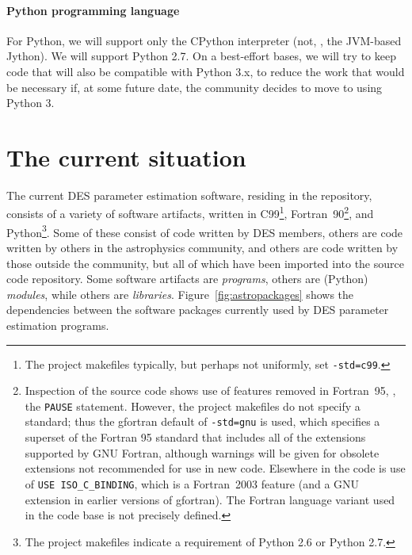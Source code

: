 \documentclass[draftmode,draftwater]{memarticle}
\newcommand{\despipe}{\name{des-pipe}\xspace}
\begin{document}
\subsubsection{Python programming language}

For Python, we will support only the CPython interpreter (not, \eg, the
JVM-based Jython). We will support Python 2.7. On a best-effort bases,
we will try to keep code that will also be compatible with Python 3.x,
to reduce the work that would be necessary if, at some future date, the
community decides to move to using Python 3.



\chapter{The current situation\label{ch:current_situation}}

The current DES parameter estimation software, residing in the
\despipe repository, consists of a variety of software
artifacts, written in C99\footnote{The project makefiles typically, but
  perhaps not uniformly, set \texttt{-std=c99}.},
Fortran~90\footnote{Inspection of the source code shows use of features
  removed in Fortran~95, \eg, the \texttt{PAUSE} statement. However, the
  project makefiles do not specify a standard; thus the gfortran default
  of \texttt{-std=gnu} is used, which specifies a superset of the
  Fortran 95 standard that includes all of the extensions supported by
  GNU Fortran, although warnings will be given for obsolete extensions
  not recommended for use in new code. Elsewhere in the code is use of
  \texttt{USE ISO\_C\_BINDING}, which is a Fortran~2003 feature (and a
  GNU extension in earlier versions of gfortran). The Fortran language
  variant used in the code base is not precisely defined.}, and
Python\footnote{The project makefiles indicate a requirement of Python
  2.6 or Python 2.7.}. Some of these consist of code written by DES
members, others are code written by others in the astrophysics
community, and others are code written by those outside the community,
but all of which have been imported into the \despipe source
code repository. Some software artifacts are \emph{programs}, others are
(Python) \emph{modules}, while others are \emph{libraries}.
Figure~\ref{fig:astropackages} shows the dependencies between the
software packages currently used by DES parameter estimation programs.
\end{document}
